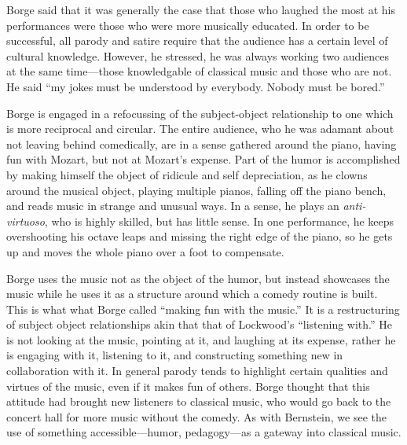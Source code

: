 \documentclass[12pt,letterpaper]{article}
\begin{document}
	Borge said that it was generally the case that those who laughed
	the most at his performances were those who were more musically 
	educated. In order to be successful, all parody and satire require that
	the audience has a certain level of cultural 
	knowledge.\autocite[249]{Garrett} However, he stressed, he was always 
	working two audiences at the same time---those knowledgable of classical
	music and those who are not. He said ``my jokes must be understood by 
	everybody. Nobody must be bored.''\autocite[256]{Garrett} 

 	Borge is engaged in a refocussing of the subject-object 
	relationship to one which is more reciprocal and circular. The entire 
	audience, who he was adamant about not leaving behind comedically, are
	in a sense gathered around the piano, having fun with Mozart, but not at
	Mozart's expense. Part of the humor is accomplished by making himself
	the object of ridicule and self depreciation, as he clowns around the
	musical object, playing multiple pianos, falling off the piano bench,
	and reads music in strange and unusual ways. In a sense, he plays an
	\textit{anti-virtuoso}, who is highly skilled, but has little sense. 
	In one performance, he keeps overshooting his octave leaps and missing
	the right edge of the piano, so he gets up and moves the whole piano
	over a foot to compensate. 

	Borge uses the music not as the object of the humor, but instead
	showcases the music while he uses it as a structure
	around which a comedy routine is built. 
	This is what what Borge called ``making fun with the music.'' It is a 
	restructuring
	of subject object relationships akin that that of Lockwood's ``listening
	with.'' He is not looking at the music, pointing at it, and laughing at
	its expense, rather he is engaging with it, listening to it, and 
	constructing something new in collaboration with it. In general parody 
	tends to highlight certain qualities and virtues of the music, even if 
	it makes fun of others. Borge thought that this attitude had brought
	new listeners to classical music, who would go back to the concert hall 
	for more music without the comedy.\autocite[256]{Garrett} As with 
	Bernstein, we see the use of something accessible---humor,
	pedagogy---as a gateway into classical music.
\end{document}
